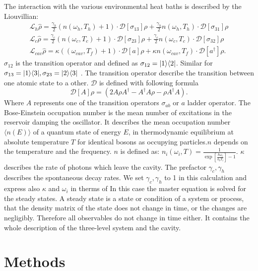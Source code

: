 \documentclass[12pt,a4paper]{article}
\DeclarePairedDelimiter\bra{\langle}{\rvert}
\DeclarePairedDelimiter\ket{\lvert}{\rangle}
\begin{document}
The interaction with the various environmental heat baths is described by the Liouvillian:
\begin{equation}
\begin{aligned}
\mathcal{L}_h\hat{\rho}=\frac{\gamma_h}{2}(n(\omega_h,T_h)+1)   \cdot \mathcal{D}[\sigma_{13}]\rho
+\frac{\gamma_h}{2}n(\omega_h,T_h)\cdot \mathcal{D}[\sigma_{31}]\rho \\
\mathcal{L}_c\hat{\rho}=\frac{\gamma_c}{2}(n(\omega_c,T_c)+1)\cdot \mathcal{D}[\sigma_{23}]\rho
+\frac{\gamma_c}{2}n(\omega_c,T_c) \cdot \mathcal{D}[\sigma_{32}]\rho \\
\mathcal{L}_{cav}\hat{\rho}=\kappa((\omega_{cav},T_f)+1)	\cdot\mathcal{D}[a]\rho+
\kappa n(\omega_{cav},T_f)\cdot \mathcal{D}[a^{\dag}]\rho.
\end{aligned}
\end{equation}
$\sigma_{12} $ is the transition operator and defined as $ \sigma_{12}=\ket{1}\bra{2}$. Similar for $\sigma_{13}=\ket{1}\bra{3}, \sigma_{23}=\ket{2}\bra{3}$ . The transition operator describe the transition between one atomic state to a other.
$\mathcal{D}$ is defined with following formula
\begin{equation}
\mathcal{D}[A]\rho=(2A \rho	A^{\dag}-A^{\dag}A\rho-\rho A^{\dag}A).
\end{equation}
Where $A$ represents one of the transition operators $\sigma_{ab}$ or $a$ ladder operator.
The Bose-Einstein occupation number is the mean number of excitations in the reservoir damping the oscillator. It describes the mean occupation number $\langle n(E) \rangle$ of a quantum state of energy $E$, in thermodynamic equilibrium at absolute temperature $T $ for identical bosons as occupying particles.$ n$ depends on the temperature and the frequency.
$n$ is defined as:
$
n_i(\omega_i,T)=\frac{1}{\exp[\frac{\hbar \omega_i}{k_b T_i}]-1}.
$
$\kappa$ describes the rate of photons which leave the cavity.
The  prefactor $\gamma_c ,\gamma_h$ describes the spontaneous decay rates. We set $\gamma_c ,\gamma_h$ to 1 in this calculation and express also $\kappa$  and $\omega_i$ in  therms of  
In this case the master equation is solved for the steady states.
A steady state is a state or condition of a system or process, that the density matrix of the state does not change in time, or the changes are negligibly. Therefore all observables do not change in time either. 
It contains the whole description of the three-level system and the cavity.
\section{Methods}
\end{document}
